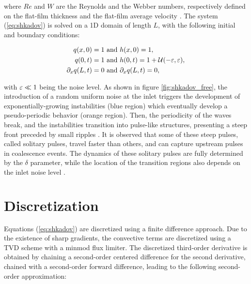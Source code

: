 \noindent where $Re$ and $W$ are the Reynolds and the Webber numbers, respectively defined on the flat-film thickness and the flat-film average velocity \cite{chang2002}. The system (\ref{eq:shkadov}) is solved on a 1D domain of length $L$, with the following initial and boundary conditions:

\begin{equation}
\label{eq:shkadov_bc}
\begin{split}
	q(x,0)	&= 1 \text{ and } h(x,0)	= 1, \\
	q(0,t) 	&= 1 \text{ and } h(0,t) 	= 1 + \mathcal{U} ( -\varepsilon, \varepsilon), \\
	\partial_x q(L,t) &= 0 \text{ and } 	\partial_x q(L,t) = 0,
\end{split}
\end{equation}

with $\varepsilon \ll 1$ being the noise level. As shown in figure \ref{fig:shkadov_free}, the introduction of a random uniform noise at the inlet triggers the development of exponentially-growing instabilities (blue region) which eventually develop a pseudo-periodic behavior (orange region). Then, the periodicity of the waves break, and the instabilities transition into pulse-like structures, presenting a steep front preceded by small ripples \cite{chang2002book}. It is observed that some of these steep pulses, called solitary pulses, travel faster than others, and can capture upstream pulses in coalescence events. The dynamics of these solitary pulses are fully determined by the $\delta$ parameter, while the location of the transition regions also depends on the inlet noise level \cite{chang2002}.



\section{Discretization}

Equations (\ref{eq:shkadov}) are discretized using a finite difference approach. Due to the existence of sharp gradients, the convective terms are discretized using a TVD scheme with a minmod flux limiter. The discretized third-order derivative is obtained by chaining a second-order centered difference for the second derivative, chained with a second-order forward difference, leading to the following second-order approximation:

